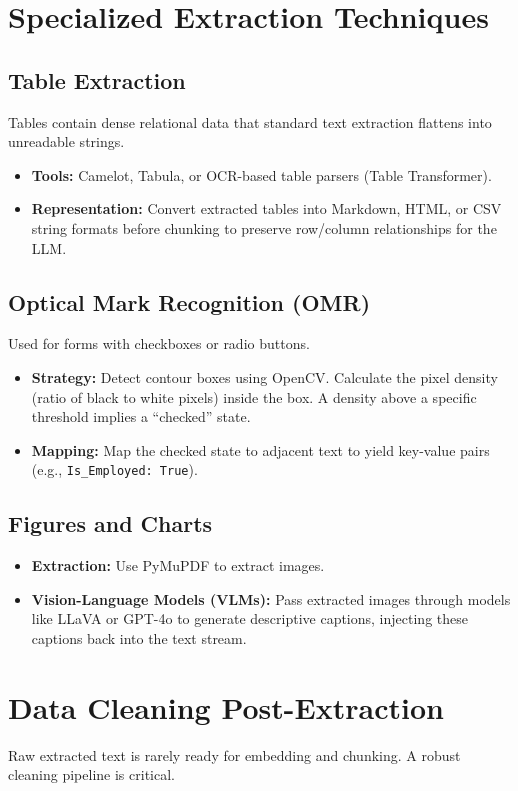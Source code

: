 \documentclass[12pt, a4paper]{article}
\begin{document}
\section{Specialized Extraction Techniques}

\subsection{Table Extraction}
Tables contain dense relational data that standard text extraction flattens into unreadable strings.
\begin{itemize}
    \item \textbf{Tools:} Camelot, Tabula, or OCR-based table parsers (Table Transformer).
    \item \textbf{Representation:} Convert extracted tables into Markdown, HTML, or CSV string formats before chunking to preserve row/column relationships for the LLM.
\end{itemize}

\subsection{Optical Mark Recognition (OMR)}
Used for forms with checkboxes or radio buttons.
\begin{itemize}
    \item \textbf{Strategy:} Detect contour boxes using OpenCV. Calculate the pixel density (ratio of black to white pixels) inside the box. A density above a specific threshold implies a ``checked'' state.
    \item \textbf{Mapping:} Map the checked state to adjacent text to yield key-value pairs (e.g., \texttt{Is\_Employed: True}).
\end{itemize}

\subsection{Figures and Charts}
\begin{itemize}
    \item \textbf{Extraction:} Use PyMuPDF to extract images.
    \item \textbf{Vision-Language Models (VLMs):} Pass extracted images through models like LLaVA or GPT-4o to generate descriptive captions, injecting these captions back into the text stream.
\end{itemize}

\section{Data Cleaning Post-Extraction}
Raw extracted text is rarely ready for embedding and chunking. A robust cleaning pipeline is critical.
\end{document}
